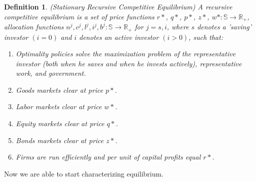 \documentclass[12pt]{article}%
\newtheorem{definition}[theorem]{Definition}
\begin{document}
\begin{definition}
 (Stationary Recursive Competitive Equilibrium) A recursive competitive
 equilibrium is a  set of price functions $r*$, $q*$, $p*$, $z*$, $w*: \mathbb{S} \rightarrow
 \mathbb{R}_{+}$, allocation functions $n^j, c^j, l^j, i^j, b^j: \mathbb{S} \rightarrow
 \mathbb{R}_{+}$ for $j=s,i$, where $s$ denotes a 'saving' investor $(i=0)$ and $i$
 denotes an active investor $(i >0)$, such that:
  \begin{enumerate}
   \item Optimality policies solve the maximization problem of the
   representative investor (both when he saves and when he invests actively),
   representative work, and government.
    \item Goods markets clear at price $p*$.
     \item Labor markets clear at price $w*$.
      \item Equity markets clear at price $q*$.
       \item Bonds markets clear at price $z*$.
        \item Firms are run efficiently and per unit of capital profits equal
        $r*$.
\end{enumerate}
\end{definition}
Now we are able to start characterizing equilibrium. 
\end{document}
